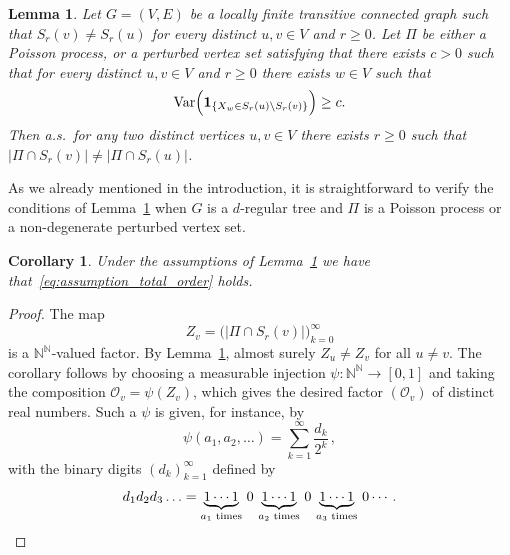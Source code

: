 \documentclass[11pt, reqno]{article}
\newtheorem{lemma}[thm]{Lemma}
\newtheorem{corollary}[thm]{Corollary}
\numberwithin{equation}{section}
\theoremstyle{definition}
\def\cO{\mathcal{O}}
\def\N{\mathbb{N}}
\newcommand{\1}{\mathds{1}}
\begin{document}
\begin{lemma}\label{lem:distinct-point-counts}
    Let $G=(V,E)$ be a locally finite transitive connected graph such that $S_r(v) \neq S_r(u)$ for every distinct $u,v\in V$ and $r\ge 0$.    
    Let $\Pi$ be either a Poisson process, or a perturbed vertex set satisfying that there exists $c>0$ such that for every distinct $u,v\in V$ and $r\ge 0$ there exists $w \in V$ such that 
    \begin{equation} \label{eq:lem:distinct_point_count_condition_on_w}
        \text{\normalfont Var}\Big(\mathbf{1}_{\{X_{w} \in S_r(u) \setminus S_r(v)\}} \Big) \ge c.
    \end{equation}
    Then a.s.\ for any two distinct vertices $u,v\in V$ there exists $r\ge 0$ such that $|\Pi \cap S_r(v)| \neq |\Pi \cap S_r(u)|$.
\end{lemma}
\noindent
As we already mentioned in the introduction, it is straightforward to verify the conditions of Lemma~\ref{lem:distinct-point-counts} when $G$ is a $d$-regular tree and $\Pi$ is a Poisson process or a non-degenerate perturbed vertex set.

\begin{corollary}
    Under the assumptions of Lemma~\ref{lem:distinct-point-counts} we have that~\eqref{eq:assumption_total_order} holds.
\end{corollary}
\begin{proof}
    The map
    \[
    Z_v = \big(|\Pi\cap S_r(v)|\big)_{k=0}^\infty
    \]
    is a $\N^\N$-valued factor. By Lemma~\ref{lem:distinct-point-counts}, almost surely $Z_u\not=Z_v$ for all $u\not=v$. The corollary follows by choosing a measurable injection $\psi \colon \N^\N \to [0,1]$ and taking the composition $\cO_v = \psi(Z_v)$, which gives the desired factor $(\cO_v)$ of distinct real numbers. 
    Such a $\psi$ is given, for instance, by
    \[
    \psi(a_1,a_2,\ldots) = \sum_{k=1}^\infty \frac{d_k}{2^k} \, , 
    \]
    with the binary digits $(d_k)_{k=1}^\infty$ defined by
    \[
    d_1d_2d_3\ldots = \underbrace{1\cdots1}_{a_1\text{ times}}\,0\,
    \underbrace{1\cdots1}_{a_2\text{ times}}\,0\,
    \underbrace{1\cdots1}_{a_3\text{ times}}\,0\cdots. \qedhere
    \]
\end{proof}
\end{document}
